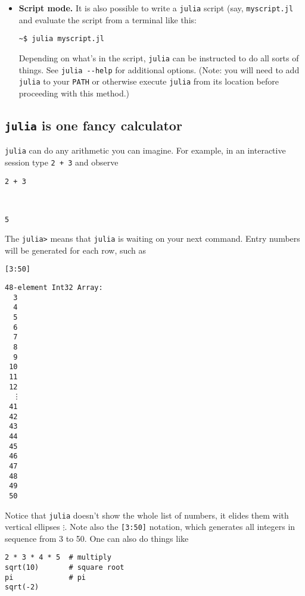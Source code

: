\documentclass[11pt]{article}
\begin{document}
\begin{itemize}
\item \textbf{Script mode.} It is also possible to write a \texttt{julia} script (say, \texttt{myscript.jl} and evaluate the script from a terminal like this:

\begin{verbatim}
~$ julia myscript.jl
\end{verbatim}

Depending on what's in the script, \texttt{julia} can be instructed to do
all sorts of things.  See \texttt{julia -{}-help} for additional
options. (Note: you will need to add \texttt{julia} to your \texttt{PATH} or
otherwise execute \texttt{julia} from its location before proceeding with
this method.)
\end{itemize}
\subsection[\texttt{julia} is one fancy calculator]{\texttt{julia} is one fancy calculator}
\label{sec-2-2}

\texttt{julia} can do any arithmetic you can imagine. For example, in an
interactive session type \texttt{2 + 3} and observe

\begin{verbatim}
2 + 3
\end{verbatim}

\begin{verbatim}


5
\end{verbatim}

The \texttt{julia>} means that \texttt{julia} is waiting on your next command. Entry
numbers will be generated for each row, such as

\begin{verbatim}
[3:50]
\end{verbatim}

\begin{verbatim}
48-element Int32 Array:
  3
  4
  5
  6
  7
  8
  9
 10
 11
 12
  ⋮
 41
 42
 43
 44
 45
 46
 47
 48
 49
 50
\end{verbatim}

Notice that \texttt{julia} doesn't show the whole list of numbers, it elides
them with vertical ellipses \(\vdots\). Note also the \texttt{[3:50]}
notation, which generates all integers in sequence from 3 to 50. One
can also do things like

\begin{verbatim}
2 * 3 * 4 * 5  # multiply
sqrt(10)       # square root
pi             # pi
sqrt(-2)
\end{verbatim}
\end{document}
